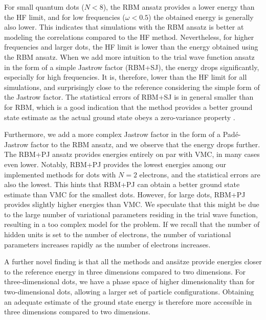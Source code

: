 For small quantum dots ($N<8$), the RBM ansatz provides a lower energy than the HF limit, and for low frequencies ($\omega<0.5$) the obtained energy is generally also lower. This indicates that simulations with the RBM ansatz is better at modeling the correlations compared to the HF method. Nevertheless, for higher frequencies and larger dots, the HF limit is lower than the energy obtained using the RBM ansatz. When we add more intuition to the trial wave function ansatz in the form of a simple Jastrow factor (RBM+SJ), the energy drops significantly, especially for high frequencies. It is, therefore, lower than the HF limit for all simulations, and surprisingly close to the reference considering the simple form of the Jastrow factor. The statistical errors of RBM+SJ is in general smaller than for RBM, which is a good indication that the method provides a better ground state estimate as the actual ground state obeys a zero-variance property \supercite{assaraf_zero-variance_2003}. 

Furthermore, we add a more complex Jastrow factor in the form of a Padé-Jastrow factor to the RBM ansatz, and we observe that the energy drops further. The RBM+PJ ansatz provides energies entirely on par with VMC, in many cases even lower. Notably, RBM+PJ provides the lowest energies among our implemented methods for dots with $N=2$ electrons, and the statistical errors are also the lowest. This hints that RBM+PJ can obtain a better ground state estimate than VMC for the smallest dots. However, for large dots, RBM+PJ provides slightly higher energies than VMC. We speculate that this might be due to the large number of variational parameters residing in the trial wave function, resulting in a too complex model for the problem. If we recall that the number of hidden units is set to the number of electrons, the number of variational parameters increases rapidly as the number of electrons increases. 

A further novel finding is that all the methods and ansätze provide energies closer to the reference energy in three dimensions compared to two dimensions. For three-dimensional dots, we have a phase space of higher dimensionality than for two-dimensional dots, allowing a larger set of particle configurations. Obtaining an adequate estimate of the ground state energy is therefore more accessible in three dimensions compared to two dimensions.

